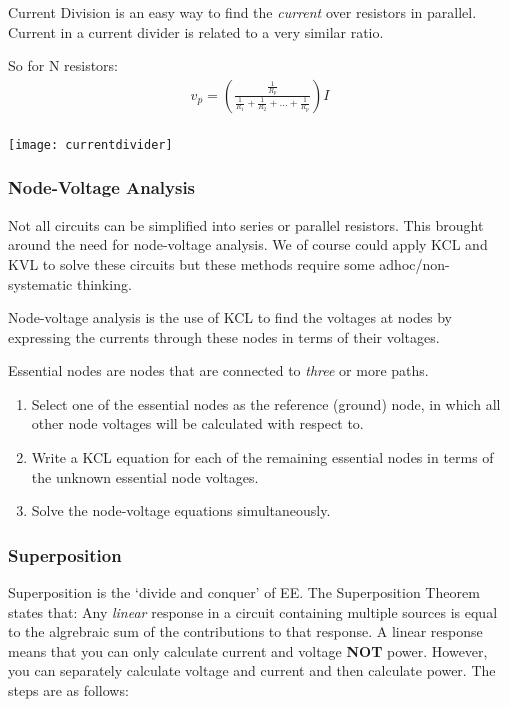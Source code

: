\documentclass[12pt]{article}
\begin{document}
Current Division is an easy way to find the \textit{current} over resistors in parallel.
Current in a current divider is related to a very similar ratio.

So for N resistors:
\begin{align*}
  v_p = (\frac{\frac{1}{R_p}}{\frac{1}{R_1} + \frac{1}{R_2} + \dots + \frac{1}{R_p}})I \\
\end{align*} 

\begin{marginfigure}
  \vspace{-5cm}

  \texttt{[image: currentdivider]}
\end{marginfigure}

\subsubsection{Node-Voltage Analysis}
Not all circuits can be simplified into series or parallel resistors.
This brought around the need for node-voltage analysis.
We of course could apply KCL and KVL to solve these circuits but these methods require some adhoc/non-systematic thinking.

Node-voltage analysis is the use of KCL to find the voltages at nodes by expressing the currents through these nodes in terms of their voltages. 

Essential nodes are nodes that are connected to \textit{three} or more paths. 

\begin{enumerate}
  \item Select one of the essential nodes as the reference (ground) node, in which all other node voltages will be calculated with respect to.
  \item Write a KCL equation for each of the remaining essential nodes in terms of the unknown essential node voltages.
  \item Solve the node-voltage equations simultaneously.
\end{enumerate}

\begin{example}

\end{example}

\subsubsection{Superposition}
Superposition is the `divide and conquer' of EE. 
The Superposition Theorem states that: Any \textit{linear} response in a circuit containing multiple sources is equal to the algrebraic sum of the contributions to that response.
A linear response means that you can only calculate current and voltage \textbf{NOT} power.
However, you can separately calculate voltage and current and then calculate power. 
The steps are as follows:
\end{document}
